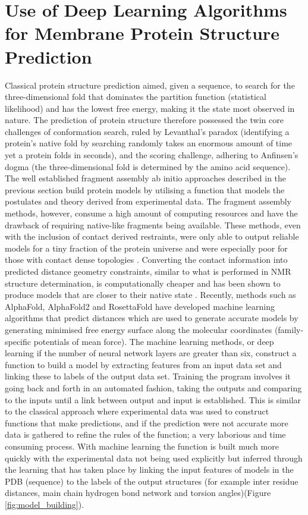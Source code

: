 \section{Use of Deep Learning Algorithms for Membrane Protein Structure Prediction}
Classical protein structure prediction aimed, given a sequence, to search for the three-dimensional fold that dominates the partition function (statistical likelihood) and has the lowest free energy, making it the state most observed in nature.  The prediction of protein structure therefore possessed the twin core challenges of conformation search, ruled by Levanthal's paradox (identifying a protein's native fold by searching randomly takes an enormous amount of time yet a protein folds in seconds), and the scoring challenge, adhering to Anfinsen's dogma (the three-dimensional fold is determined by the amino acid sequence).   The well established fragment assembly ab initio approaches described in the previous section build protein models by utilising a function that models the postulates and theory derived from experimental data.  The fragment assembly methods, however, consume a high amount of computing resources and have the drawback of requiring native-like fragments being available. These methods, even with the inclusion of contact derived restraints, were only able to output reliable models for a tiny fraction of the protein universe and were especially poor for those with contact dense topologies \cite{leman2020macromolecular}.  Converting the contact information into predicted distance geometry constraints, similar to what is performed in NMR structure determination, is computationally cheaper and has been shown to produce models that are closer to their native state \cite{havel1991evaluation}.  Recently, methods such as AlphaFold, AlphaFold2 and RosettaFold have developed machine learning algorithms that predict distances which are used to generate accurate models by generating minimised free energy surface along the molecular coordinates (family-specific potentials of mean force).  The machine learning methods, or deep learning if the number of neural network layers are greater than six, construct a function to build a model by extracting features from an input data set and linking these to labels of the output data set.  Training the program involves it going back and forth in an automated fashion, taking the outputs and comparing to the inputs until a link between output and input is established.  This is similar to the classical approach where experimental data was used to construct functions that make predictions, and if the prediction were not accurate more data is gathered to refine the rules of the function; a very laborious and time consuming process.  With machine learning the function is built much more quickly with the experimental data not being used explicitly but  inferred through the learning that has taken place by linking the input features of models in the PDB (sequence) to the labels of the output structures (for example inter residue distances, main chain hydrogen bond network and torsion angles)(Figure \ref{fig:model_building}).
